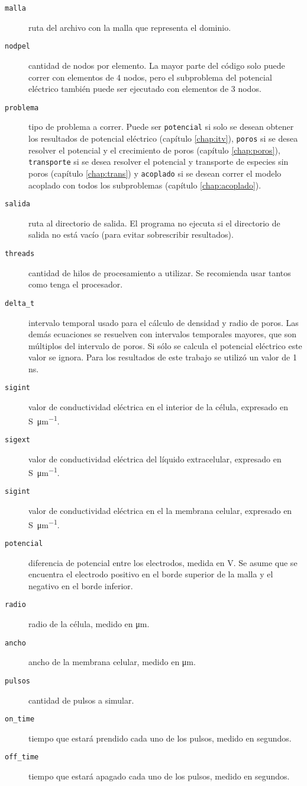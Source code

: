 \begin{description}
	\item[\texttt{malla}] ruta del archivo con la malla que representa el dominio. 
	\item[\texttt{nodpel}] cantidad de nodos por elemento. La mayor parte del código solo puede correr con elementos de 4 nodos, pero el subproblema del potencial eléctrico también puede ser ejecutado con elementos de 3 nodos.
	\item[\texttt{problema}] tipo de problema a correr. Puede ser \texttt{potencial} si solo se desean obtener los resultados de potencial eléctrico (capítulo \ref{chap:itv}), \texttt{poros} si se desea resolver el potencial y el crecimiento de poros (capítulo \ref{chap:poros}), \texttt{transporte} si se desea resolver el potencial y transporte de especies sin poros (capítulo \ref{chap:trans}) y \texttt{acoplado} si se desean correr el modelo acoplado con todos los subproblemas (capítulo \ref{chap:acoplado}).
	\item[\texttt{salida}] ruta al directorio de salida. El programa no ejecuta si el directorio de salida no está vacío (para evitar sobrescribir resultados).
	\item[\texttt{threads}] cantidad de hilos de procesamiento a utilizar. Se recomienda usar tantos como tenga el procesador.
	\item[\texttt{delta\_t}] intervalo temporal usado para el cálculo de densidad y radio de poros. Las demás ecuaciones se resuelven con intervalos temporales mayores, que son múltiplos del intervalo de poros. Si sólo se calcula el potencial eléctrico este valor se ignora. Para los resultados de este trabajo se utilizó un valor de 1 \si{\nano\second}.
	\item[\texttt{sigint}] valor de conductividad eléctrica en el interior de la célula, expresado en \si{\siemens \per \micro\metre}.
	\item[\texttt{sigext}] valor de conductividad eléctrica del líquido extracelular, expresado en \si{\siemens \per \micro\metre}.
	\item[\texttt{sigint}] valor de conductividad eléctrica en el la membrana celular, expresado en \si{\siemens \per \micro\metre}.
	\item[\texttt{potencial}] diferencia de potencial entre los electrodos, medida en \si{\volt}. Se asume que se encuentra el electrodo positivo en el borde superior de la malla y el negativo en el borde inferior.
	\item[\texttt{radio}] radio de la célula, medido en \si{\micro\metre}.
	\item[\texttt{ancho}] ancho de la membrana celular, medido en \si{\micro\metre}.
	\item[\texttt{pulsos}] cantidad de pulsos a simular.
	\item[\texttt{on\_time}] tiempo que estará prendido cada uno de los pulsos, medido en segundos.
	\item[\texttt{off\_time}] tiempo que estará apagado cada uno de los pulsos, medido en segundos. 
\end{description}


